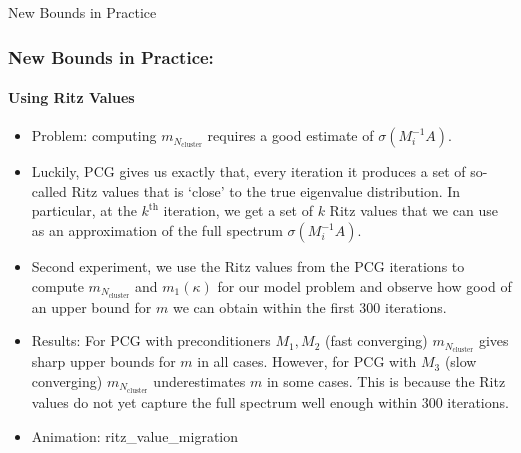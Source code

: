 \begin{frame}[label=early_bounds]{New Bounds in Practice}
    \frametitle{New Bounds in Practice:}
    \framesubtitle{Using Ritz Values}
        \begin{itemize}
            \item<1-> Problem: computing $m_{N_{\text{cluster}}}$ requires a good estimate of $\sigma(M_i^{-1}A)$.
            \item<2-> Luckily, PCG gives us exactly that, every iteration it produces a set of so-called Ritz values that is `close' to the true eigenvalue distribution. In particular, at the $k^{\text{th}}$ iteration, we get a set of $k$ Ritz values that we can use as an approximation of the full spectrum $\sigma(M_i^{-1}A)$.
            \item<3-> Second experiment, we use the Ritz values from the PCG iterations to compute $m_{N_{\text{cluster}}}$ and $m_1(\kappa)$ for our model problem and observe how good of an upper bound for $m$ we can obtain within the first 300 iterations.
            \item<4-> Results: For PCG with preconditioners $M_1, M_2$ (fast converging) $m_{N_{\text{cluster}}}$ gives sharp upper bounds for $m$ in all cases. However, for PCG with $M_3$ (slow converging) $m_{N_{\text{cluster}}}$ underestimates $m$ in some cases. This is because the Ritz values do not yet capture the full spectrum well enough within 300 iterations.
            \item<5-> Animation: ritz\_value\_migration
        \end{itemize}
\end{frame}